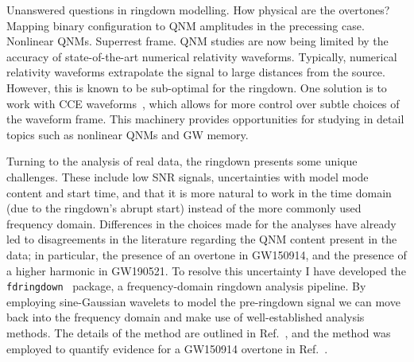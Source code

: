 \documentclass[
12pt, %
english, %
doublespacing, %
headsepline, %
]{MastersDoctoralThesis} %
\begin{document}
Unanswered questions in ringdown modelling.
How physical are the overtones?
Mapping binary configuration to QNM amplitudes in the precessing case.
Nonlinear QNMs.
Superrest frame. 
QNM studies are now being limited by the accuracy of state-of-the-art numerical relativity waveforms. 
Typically, numerical relativity waveforms extrapolate the signal to large distances from the source.
However, this is known to be sub-optimal for the ringdown.
One solution is to work with CCE waveforms~\cite{MaganaZertuche:2021syq}, which allows for more control over subtle choices of the waveform frame.
This machinery provides opportunities for studying in detail topics such as nonlinear QNMs and GW memory. 

Turning to the analysis of real data, the ringdown presents some unique challenges. 
These include low SNR signals, uncertainties with model mode content and start time, and that it is more natural to work in the time domain (due to the ringdown's abrupt start) instead of the more commonly used frequency domain.
Differences in the choices made for the analyses have already led to disagreements in the literature regarding the QNM content present in the data; in particular, the presence of an overtone in GW150914, and the presence of a higher harmonic in GW190521. 
To resolve this uncertainty I have developed the \texttt{fdringdown}~\cite{fdringdown} package, a frequency-domain ringdown analysis pipeline.
By employing sine-Gaussian wavelets to model the pre-ringdown signal we can move back into the frequency domain and make use of well-established analysis methods. 
The details of the method are outlined in Ref.~\cite{Finch:2021qph}, and the method was employed to quantify evidence for a GW150914 overtone in Ref.~\cite{Finch:2022ynt}.
\end{document}
